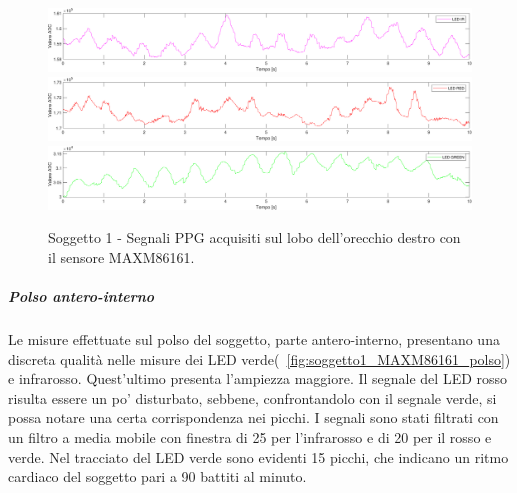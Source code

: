 \begin{figure}[h]
	\centering
	\includegraphics[width=1\linewidth]{ImageFiles/Misure Preliminari/Soggetto 1/MAXM86161/lobo_ired}
	\includegraphics[width=1\linewidth]{ImageFiles/Misure Preliminari/Soggetto 1/MAXM86161/lobo_red}
	\includegraphics[width=1\linewidth]{ImageFiles/Misure Preliminari/Soggetto 1/MAXM86161/lobo_green}
	\caption{Soggetto 1 - Segnali PPG acquisiti sul lobo dell'orecchio destro con il sensore MAXM86161.}
	\label{fig:soggetto1_MAXM86161_lobo}
\end{figure}

\clearpage

\subparagraph{Polso antero-interno}

Le misure effettuate sul polso del soggetto, parte antero-interno, presentano una discreta qualità nelle misure dei LED verde(\Fig~\ref{fig:soggetto1_MAXM86161_polso}) e infrarosso. Quest'ultimo presenta l'ampiezza maggiore. Il segnale del LED rosso risulta essere un po' disturbato, sebbene, confrontandolo con il segnale verde, si possa notare una certa corrispondenza nei picchi. I segnali sono stati filtrati con un filtro a media mobile con finestra di  25 per l'infrarosso e di 20 per il rosso e verde. Nel tracciato del LED verde sono evidenti 15 picchi, che indicano un ritmo cardiaco del soggetto pari a 90 battiti al minuto.

